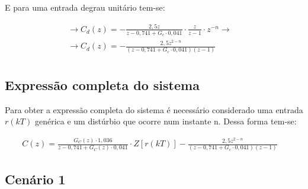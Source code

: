 \documentclass[a4paper,12pt]{article}
\begin{document}
			
			
%					
%					
%					
			
			E para uma entrada degrau unitário tem-se:
			
			\begin{equation}
				\left.
				\begin{array}{c}
					\displaystyle \rightarrow C_d(z) = - \frac{2,5z}{z-0,741 + G_c\cdot 0,041} \cdot \frac{z}{z-1} \cdot z^{-n} \rightarrow \\[20pt]
					
					\displaystyle \rightarrow C_d(z) = - \frac{2,5z^{2-n}}{(z-0,741 + G_c\cdot 0,041)(z-1)} \\[20pt]
				\end{array}
				\right.
				\quad 
			\end{equation}
						
			
		\subsection{Expressão completa do sistema}
			Para obter a expressão completa do sistema é necessário considerado uma entrada $r(kT)$ genérica e um distúrbio que ocorre num instante n. Dessa forma tem-se:
			
			\begin{equation}
				\left.
				\begin{array}{c}
					\displaystyle C(z) = \frac{G_C(z) \cdot 1,036}{z - 0,741 + G_C(z) \cdot 0,041} \cdot Z\left[r(kT)\right] - \frac{2,5z^{2-n}}{(z-0,741 + G_c\cdot 0,041)(z-1)}
				\end{array}
				\right.
				\quad 
			\end{equation}
			
		\subsection{Cenário 1}
		
\end{document}
